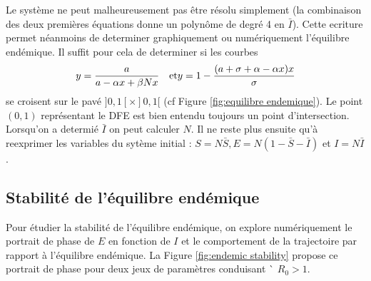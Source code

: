 \documentclass[11pt]{article}
\begin{document}
Le syst\`eme ne peut malheureusement pas \^etre r\'esolu simplement (la combinaison des deux premi\`eres \'equations donne un polyn\^ome de degr\'e 4 en $\bar I$). Cette ecriture permet n\'eanmoins de determiner graphiquement ou num\'eriquement l'\'equilibre end\'emique. Il suffit pour cela de determiner si les courbes
\[
y = \frac{a}  {a - \alpha x + \beta N x} \quad \text{et} \\
y = 1 -\frac{(a + \sigma + \alpha - \alpha x) x}{\sigma}
\] 
se croisent sur le pav\'e $]0,1[\times ]0,1[$ (cf Figure \ref{fig:equilibre endemique}). Le point $(0,1)$ repr\'esentant le DFE est bien entendu toujours un point d'intersection. Lorsqu'on a determi\'e $\bar I$ on peut calculer $N$. Il ne reste plus ensuite qu'\`a reexprimer les variables du syt\`eme initial : $S = N \bar S, E = N (1-\bar S - \bar I)$ et $I = N \bar I$.



\subsection{Stabilit\'e de l'\'equilibre end\'emique}
Pour \'etudier la stabilit\'e de l'\'equilibre end\'emique, on explore num\'eriquement le portrait de phase de $E$  en fonction de $I$ et le comportement de la trajectoire par rapport \`a l'\'equilibre end\'emique. La Figure \ref{fig:endemic stability} propose ce portrait de phase pour deux jeux de param\`etres conduisant \` $R_0 > 1$.
\end{document}
